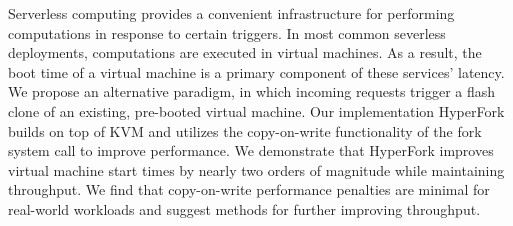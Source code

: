 
Serverless computing provides a convenient infrastructure for performing
computations in response to certain triggers. In most common severless
deployments, computations are executed in virtual machines. As a result, the
boot time of a virtual machine is a primary component of these services'
latency. We propose an alternative paradigm, in which incoming requests trigger
a flash clone of an existing, pre-booted virtual machine. Our implementation
HyperFork builds on top of KVM and utilizes the copy-on-write functionality of
the fork system call to improve performance. We demonstrate that HyperFork
improves virtual machine start times by nearly two orders of magnitude while
maintaining throughput. We find that copy-on-write performance penalties are
minimal for real-world workloads and suggest methods for further improving
throughput.
